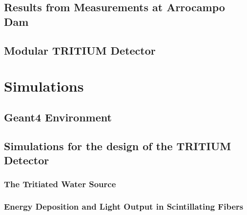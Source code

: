 \documentclass[12pt,a4paper]{book}
\begin{document}
	\section[Experimental Results in Arrocampo Dam]{Results from Measurements at Arrocampo Dam}\label{sec:ResultsArrocampo}
	
	\newpage
		
	\section[Modular TRITIUM Detector]{Modular TRITIUM Detector}\label{sec:TritiumMonitor}
	
	\newpage

\chapter{Simulations}  \label{chap:Simulations}	
	
	
	\section{Geant4 Environment}\label{sec:Geant4Environment}
	
	
	\section{Simulations for the design of the TRITIUM Detector}\label{sec:TRITIUMSimulationsDesign}
	
	
		\subsection[The Tritiated Water Source]{The Tritiated Water Source}\label{subsec:SourceShapeSimulation}
		
		
		\subsection[Energy Deposition and Light Output in Scintillating Fibers]{Energy Deposition and Light Output in Scintillating Fibers}\label{subsec:LightOutputFibers}
		
		
\end{document}
